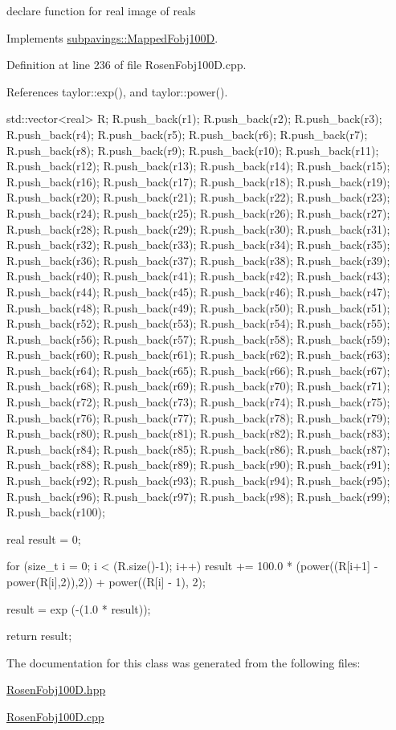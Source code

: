 declare function for real image of reals 



\-Implements \hyperlink{classsubpavings_1_1MappedFobj100D_a6623df51bcbb3ed9ddb9d7e7e38b96eb}{subpavings\-::\-Mapped\-Fobj100\-D}.



\-Definition at line 236 of file \-Rosen\-Fobj100\-D.\-cpp.



\-References taylor\-::exp(), and taylor\-::power().


\begin{DoxyCode}
{
    std::vector<real> R;
R.push_back(r1);
R.push_back(r2);
R.push_back(r3);
R.push_back(r4);
R.push_back(r5);
R.push_back(r6);
R.push_back(r7);
R.push_back(r8);
R.push_back(r9);
R.push_back(r10);
R.push_back(r11);
R.push_back(r12);
R.push_back(r13);
R.push_back(r14);
R.push_back(r15);
R.push_back(r16);
R.push_back(r17);
R.push_back(r18);
R.push_back(r19);
R.push_back(r20);
R.push_back(r21);
R.push_back(r22);
R.push_back(r23);
R.push_back(r24);
R.push_back(r25);
R.push_back(r26);
R.push_back(r27);
R.push_back(r28);
R.push_back(r29);
R.push_back(r30);
R.push_back(r31);
R.push_back(r32);
R.push_back(r33);
R.push_back(r34);
R.push_back(r35);
R.push_back(r36);
R.push_back(r37);
R.push_back(r38);
R.push_back(r39);
R.push_back(r40);
R.push_back(r41);
R.push_back(r42);
R.push_back(r43);
R.push_back(r44);
R.push_back(r45);
R.push_back(r46);
R.push_back(r47);
R.push_back(r48);
R.push_back(r49);
R.push_back(r50);
R.push_back(r51);
R.push_back(r52);
R.push_back(r53);
R.push_back(r54);
R.push_back(r55);
R.push_back(r56);
R.push_back(r57);
R.push_back(r58);
R.push_back(r59);
R.push_back(r60);
R.push_back(r61);
R.push_back(r62);
R.push_back(r63);
R.push_back(r64);
R.push_back(r65);
R.push_back(r66);
R.push_back(r67);
R.push_back(r68);
R.push_back(r69);
R.push_back(r70);
R.push_back(r71);
R.push_back(r72);
R.push_back(r73);
R.push_back(r74);
R.push_back(r75);
R.push_back(r76);
R.push_back(r77);
R.push_back(r78);
R.push_back(r79);
R.push_back(r80);
R.push_back(r81);
R.push_back(r82);
R.push_back(r83);
R.push_back(r84);
R.push_back(r85);
R.push_back(r86);
R.push_back(r87);
R.push_back(r88);
R.push_back(r89);
R.push_back(r90);
R.push_back(r91);
R.push_back(r92);
R.push_back(r93);
R.push_back(r94);
R.push_back(r95);
R.push_back(r96);
R.push_back(r97);
R.push_back(r98);
R.push_back(r99);
R.push_back(r100);
    
    real result = 0;
    
    for (size_t i = 0; i < (R.size()-1); i++) 
    {
      result += 100.0 * (power((R[i+1] - power(R[i],2)),2)) +
                  power((R[i] - 1), 2);
    }

  result = exp (-(1.0 * result));

   return result;
}
\end{DoxyCode}


\-The documentation for this class was generated from the following files\-:\begin{DoxyCompactItemize}
\item 
\hyperlink{RosenFobj100D_8hpp}{\-Rosen\-Fobj100\-D.\-hpp}\item 
\hyperlink{RosenFobj100D_8cpp}{\-Rosen\-Fobj100\-D.\-cpp}\end{DoxyCompactItemize}
